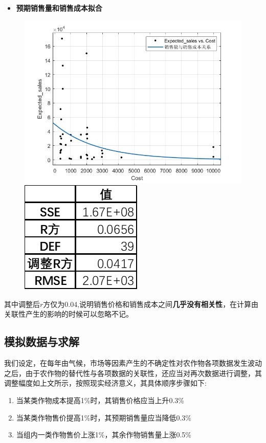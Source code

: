 \documentclass[withoutpreface,bwprint]{cumcmthesis} %
\begin{document}
\begin{itemize}
	\item \textbf{预期销售量和销售成本拟合}
\end{itemize}
\begin{figure}[H]
	\centering
	\begin{minipage}[c]{0.48\textwidth}
		\centering
		\includegraphics[height=0.2\textheight]{销量和成本}
	\end{minipage}
	\begin{minipage}[c]{0.48\textwidth}
		\centering
		\includegraphics[height=0.2\textheight]{333}
	\end{minipage}
\end{figure}

其中调整后$r$方仅为0.04,说明销售价格和销售成本之间\textbf{几乎没有相关性}，在计算由关联性产生的影响的时候可以忽略不记。
\subsection{模拟数据与求解}
我们设定，在每年由气候，市场等因素产生的不确定性对农作物各项数据发生波动之后，由于农作物的替代性与各项数据的关联性，还应当对再次数据进行调整，其调整幅度如上文所示，按照现实经济意义，其具体顺序步骤如下:
\begin{enumerate}
	\item 当某类作物成本提高1\%时，其销售价格应当上升0.3\%
	\item 当某类作物售价提高1\%时，其预期销售量应当降低0.3\%
	\item 当组内一类作物售价上涨1\%，其余作物销售量上涨0.5\%
\end{enumerate}
\end{document}
